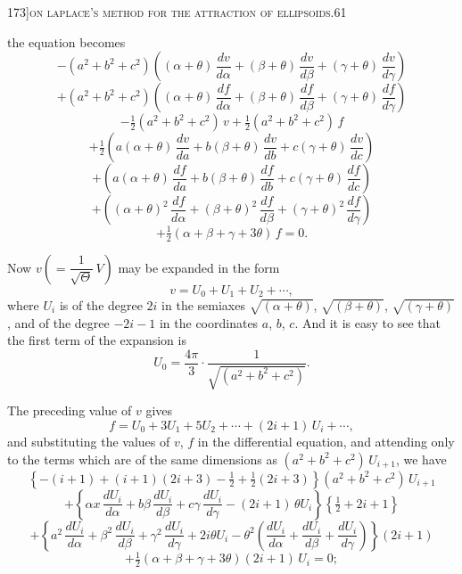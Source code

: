 \documentclass[11pt]{article}
\begin{document}
\newpage

\begin{center}
\small 173]\hfill\textsc{on laplace's method for the attraction of ellipsoids.}\hfill\textsc{61}
\end{center}

\medskip

\noindent the equation becomes
\[
- (a^{2} + b^{2} + c^{2})\left((\alpha + \theta)\,\frac{dv}{d\alpha} + (\beta + \theta)\,\frac{dv}{d\beta} + (\gamma + \theta)\,\frac{dv}{d\gamma}\right)
\]
\[
+ (a^{2} + b^{2} + c^{2})\left((\alpha + \theta)\,\frac{df}{d\alpha} + (\beta + \theta)\,\frac{df}{d\beta} + (\gamma + \theta)\,\frac{df}{d\gamma}\right)
\]
\[
- \tfrac{1}{2}(a^{2} + b^{2} + c^{2})\,v + \tfrac{1}{2}(a^{2} + b^{2} + c^{2})\,f
\]
\[
+ \tfrac{1}{2}\left(a(\alpha + \theta)\,\frac{dv}{da} + b(\beta + \theta)\,\frac{dv}{db} + c(\gamma + \theta)\,\frac{dv}{dc}\right)
\]
\[
+ \left(a(\alpha + \theta)\,\frac{df}{da} + b(\beta + \theta)\,\frac{df}{db} + c(\gamma + \theta)\,\frac{df}{dc}\right)
\]
\[
+ \left((\alpha + \theta)^{2}\,\frac{df}{d\alpha} + (\beta + \theta)^{2}\,\frac{df}{d\beta} + (\gamma + \theta)^{2}\,\frac{df}{d\gamma}\right)
\]
\[
+ \tfrac{1}{2}(\alpha + \beta + \gamma + 3\theta)\,f = 0.
\]

Now $v\left(=\dfrac{1}{\sqrt{\Theta}}\,V\right)$ may be expanded in the form
\[
v = U_{0} + U_{1} + U_{2} + \cdots,
\]
where $U_{i}$ is of the degree $2i$ in the semiaxes $\sqrt{(\alpha + \theta)}$, $\sqrt{(\beta + \theta)}$, $\sqrt{(\gamma + \theta)}$, and of the
degree $-2i-1$ in the coordinates $a$, $b$, $c$. And it is easy to see that the first term
of the expansion is
\[
U_{0} = \frac{4\pi}{3}\cdot\frac{1}{\sqrt{(a^{2} + b^{2} + c^{2})}}.
\]

The preceding value of $v$ gives
\[
f = U_{0} + 3U_{1} + 5U_{2} + \cdots + (2i + 1)\,U_{i} + \cdots,
\]
and substituting the values of $v$, $f$ in the differential equation, and attending only to
the terms which are of the same dimensions as $(a^{2} + b^{2} + c^{2})\,U_{i+1}$, we have
\[
\left\{- (i + 1) + (i + 1)(2i + 3) - \tfrac{1}{2} + \tfrac{1}{2}(2i + 3)\right\}(a^{2} + b^{2} + c^{2})\,U_{i+1}
\]
\[
+ \left\{\alpha x\,\frac{dU_{i}}{d\alpha} + b\beta\,\frac{dU_{i}}{d\beta} + c\gamma\,\frac{dU_{i}}{d\gamma} - (2i + 1)\,\theta U_{i}\right\}\left\{\tfrac{1}{2} + 2i + 1\right\}
\]
\[
+ \left\{a^{2}\,\frac{dU_{i}}{d\alpha} + \beta^{2}\,\frac{dU_{i}}{d\beta} + \gamma^{2}\,\frac{dU_{i}}{d\gamma} + 2i\theta U_{i} - \theta^{2}\left(\frac{dU_{i}}{d\alpha} + \frac{dU_{i}}{d\beta} + \frac{dU_{i}}{d\gamma}\right)\right\}(2i + 1)
\]
\[
+ \tfrac{1}{2}(\alpha + \beta + \gamma + 3\theta)(2i + 1)\,U_{i} = 0;
\]
\end{document}
